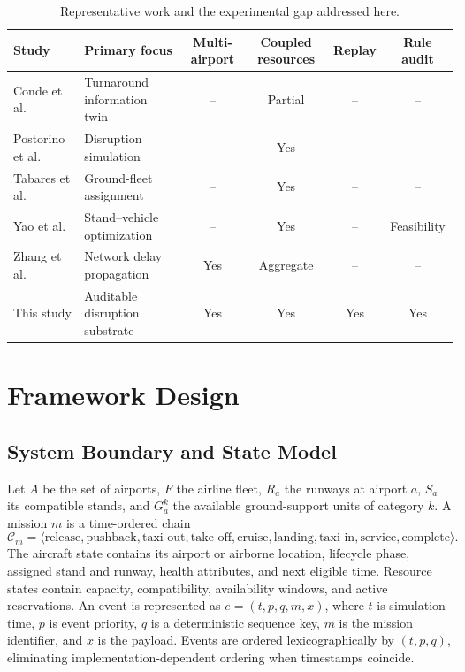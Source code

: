 \documentclass[runningheads]{llncs}
\begin{document}
\begin{table}[t]
\caption{Representative work and the experimental gap addressed here.}\label{tab:literature}
\centering\scriptsize
\begin{tabularx}{\textwidth}{p{2.1cm}Xcccc}
\toprule
Study & Primary focus & Multi-airport & Coupled resources & Replay & Rule audit \\
\midrule
Conde et al. \cite{conde2022} & Turnaround information twin & -- & Partial & -- & -- \\
Postorino et al. \cite{postorino2020} & Disruption simulation & -- & Yes & -- & -- \\
Tabares et al. \cite{tabares2021} & Ground-fleet assignment & -- & Yes & -- & -- \\
Yao et al. \cite{yao2024} & Stand--vehicle optimization & -- & Yes & -- & Feasibility \\
Zhang et al. \cite{zhang2020} & Network delay propagation & Yes & Aggregate & -- & -- \\
This study & Auditable disruption substrate & Yes & Yes & Yes & Yes \\
\bottomrule
\end{tabularx}
\end{table}

\section{Framework Design}
\subsection{System Boundary and State Model}
Let $A$ be the set of airports, $F$ the airline fleet, $R_a$ the runways at airport $a$, $S_a$ its compatible stands, and $G_a^k$ the available ground-support units of category $k$. A mission $m$ is a time-ordered chain
\begin{equation}
\mathcal{C}_m=\langle \text{release},\text{pushback},\text{taxi-out},\text{take-off},
\text{cruise},\text{landing},\text{taxi-in},\text{service},\text{complete}\rangle .
\end{equation}
The aircraft state contains its airport or airborne location, lifecycle phase, assigned stand and runway, health attributes, and next eligible time. Resource states contain capacity, compatibility, availability windows, and active reservations. An event is represented as $e=(t,p,q,m,x)$, where $t$ is simulation time, $p$ is event priority, $q$ is a deterministic sequence key, $m$ is the mission identifier, and $x$ is the payload. Events are ordered lexicographically by $(t,p,q)$, eliminating implementation-dependent ordering when timestamps coincide.
\end{document}
